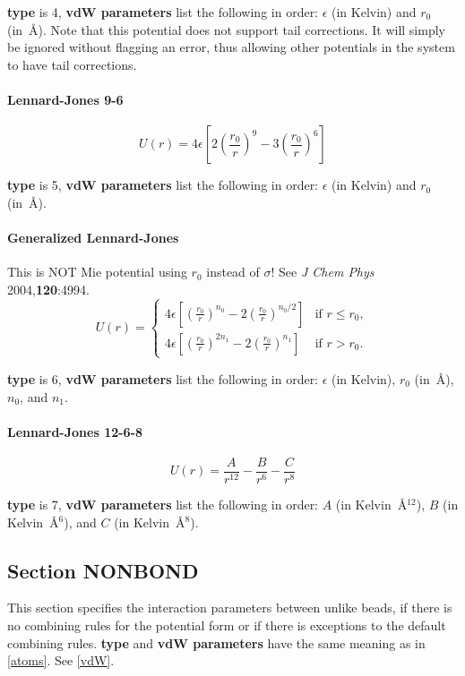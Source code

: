 \documentclass[12pt,letterpaper]{article}
\begin{document}
{\bf type} is 4, {\bf vdW parameters} list the following in
order: $\epsilon$ (in Kelvin) and $r_0$ (in~\AA). Note that
this potential does not support tail corrections. It will
simply be ignored without flagging an error, thus allowing
other potentials in the system to have tail corrections.

\paragraph{Lennard-Jones 9-6}
\begin{equation}
U(r) = 4 \epsilon \left[2\left(\frac{r_0}{r}\right)^9
-3\left(\frac{r_0}{r}\right)^6 \right]
\end{equation}

{\bf type} is 5, {\bf vdW parameters} list the following in order:
$\epsilon$ (in Kelvin) and $r_0$ (in~\AA).

\paragraph{Generalized Lennard-Jones}
This is NOT Mie potential using $r_0$ instead of $\sigma$!
See \textit{J Chem Phys} 2004,\textbf{120}:4994.
\begin{equation}
U(r) = \left\{
\begin{array}{rl}
4 \epsilon \left[\left(\frac{r_0}{r}\right)^{n_0}
-2\left(\frac{r_0}{r}\right)^{n_0/2} \right] & \text{if } r \leq r_0, \\
4 \epsilon \left[\left(\frac{r_0}{r}\right)^{2n_1}
-2\left(\frac{r_0}{r}\right)^{n_1} \right] & \text{if } r>r_0.
\end{array} \right.
\end{equation}

{\bf type} is 6, {\bf vdW parameters} list the following in
order: $\epsilon$ (in Kelvin), $r_0$ (in~\AA), $n_0$, and
$n_1$.

\paragraph{Lennard-Jones 12-6-8}
\begin{equation}
U(r) = \frac{A}{r^{12}} - \frac{B}{r^6} - \frac{C}{r^8}
\end{equation}

{\bf type} is 7, {\bf vdW parameters} list the following in
order: $A$ (in Kelvin~\AA$^{12}$), $B$ (in Kelvin~\AA$^6$),
and $C$ (in Kelvin~\AA$^8$).

\subsection{Section \textbf{NONBOND}}
\label{nonbond}
This section specifies the interaction parameters between
unlike beads, if there is no combining rules for the
potential form or if there is exceptions to the default
combining rules. {\bf type} and {\bf vdW parameters} have
the same meaning as in \ref{atoms}. See \ref{vdW}.
\end{document}
